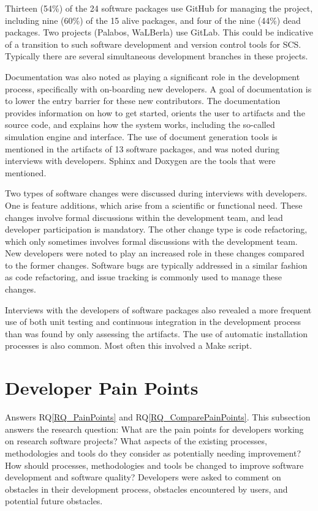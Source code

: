 \documentclass[final, 3p, times, authoryear]{elsarticle}
\newcommand{\rqref}[1]{RQ\ref{#1}}
\begin{document}
Thirteen (54\%) of the 24 software packages use GitHub for managing the project,
including nine (60\%) of the 15 alive packages, and four of the nine (44\%) dead
packages. Two projects (Palabos, WaLBerla) use GitLab. This could be indicative
of a transition to such software development and version control tools for SCS.
Typically there are several simultaneous development branches in these projects.

Documentation was also noted as playing a significant role in the development
process, specifically with on-boarding new developers. A goal of documentation
is to lower the entry barrier for these new contributors. The documentation
provides information on how to get started, orients the user to artifacts and
the source code, and explains how the system works, including the so-called
simulation engine and interface. The use of document generation tools is
mentioned in the artifacts of 13 software packages, and was noted during
interviews with developers. Sphinx and Doxygen are the tools that were
mentioned. 

Two types of software changes were discussed during interviews with developers.
One is feature additions, which arise from a scientific or functional need.
These changes involve formal discussions within the development team, and lead
developer participation is mandatory. The other change type is code refactoring,
which only sometimes involves formal discussions with the development team. New
developers were noted to play an increased role in these changes compared to the
former changes. Software bugs are typically addressed in a similar fashion as
code refactoring, and issue tracking is commonly used to manage these changes. 

Interviews with the developers of software packages also revealed a more
frequent use of both unit testing and continuous integration in the development
process than was found by only assessing the artifacts. The use of automatic
installation processes is also common. Most often this involved a Make script.

\section{Developer Pain Points} \label{painpoints}

Answers \rqref{RQ_PainPoints} and \rqref{RQ_ComparePainPoints}.  This subsection
answers the research question: What are the pain points for developers working
on research software projects? What aspects of the existing processes,
methodologies and tools do they consider as potentially needing improvement? How
should processes, methodologies and tools be changed to improve software
development and software quality? Developers were asked to comment on obstacles
in their development process, obstacles encountered by users, and potential
future obstacles.
\end{document}
